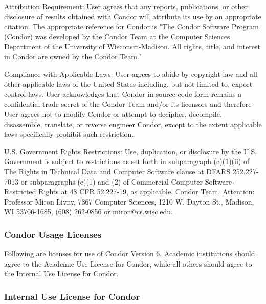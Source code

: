 Attribution Requirement: User agrees that any reports, publications,
or other disclosure of results obtained with Condor will attribute its
use by an appropriate citation. The appropriate reference for Condor
is "The Condor Software Program (Condor) was developed by the Condor
Team at the Computer Sciences Department of the University of
Wisconsin-Madison. All rights, title, and interest in Condor are owned
by the Condor Team." 

Compliance with Applicable Laws: User agrees to abide by copyright law
and all other applicable laws of the United States including, but not
limited to, export control laws. User acknowledges that Condor in
source code form remains a confidential trade secret of the Condor
Team and/or its licensors and therefore User agrees not to modify
Condor or attempt to decipher, decompile, disassemble, translate, or
reverse engineer Condor, except to the extent applicable laws
specifically prohibit such restriction. 

U.S. Government Rights Restrictions: Use, duplication, or disclosure
by the U.S. Government is subject to restrictions as set forth in
subparagraph (c)(1)(ii) of The Rights in Technical Data and Computer
Software clause at DFARS 252.227-7013 or subparagraphs (c)(1) and (2)
of Commercial Computer Software-Restricted Rights at 48 CFR 52.227-19,
as applicable, Condor Team, Attention: Professor Miron Livny, 7367
Computer Sciences, 1210 W. Dayton St., Madison, WI 53706-1685, (608)
262-0856 or miron@cs.wisc.edu. 


\subsubsection{\label{Condor-Usage-Licenses}Condor Usage Licenses}

Following are licenses for use of Condor Version 6.  Academic
institutions should agree to the Academic Use License for Condor,
while all others should agree to the Internal Use License for Condor. 

\subsubsection{\label{Internal-Use-License}Internal Use License for Condor}

